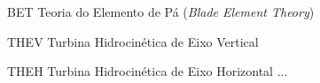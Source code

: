
\begin{siglas}
    \item[BET] Teoria do Elemento de Pá (\textit{Blade Element Theory})
    \item[THEV] Turbina Hidrocinética de Eixo Vertical
    \item[THEH] Turbina Hidrocinética de Eixo Horizontal ...
\end{siglas}

